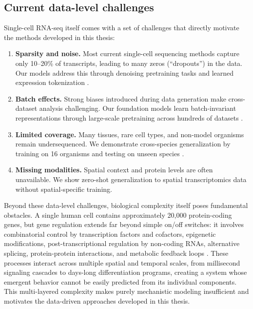 \subsection{Current data-level challenges}

Single-cell \gls{RNA-seq} itself comes with a set of challenges that directly motivate the methods
developed in this thesis:

\begin{enumerate}
  \item \textbf{Sparsity and noise.} Most current single-cell sequencing methods capture only
    10--20\% of transcripts, leading to many zeros (``dropouts'') in the data. Our models address
    this through denoising pretraining tasks and learned expression tokenization \cite{eraslanSinglecellRNAseqDenoising2019}.
  \item \textbf{Batch effects.} Strong biases introduced during data generation make cross-dataset
    analysis challenging. Our foundation models learn batch-invariant representations through
    large-scale pretraining across hundreds of datasets \cite{haghverdiBatchEffectsSinglecell2018}.
  \item \textbf{Limited coverage.} Many tissues, rare cell types, and non-model organisms remain
    undersequenced. We demonstrate cross-species generalization by training on 16 organisms and
    testing on unseen species \cite{alsabbaghFoundationModelsMeet2023}.
  \item \textbf{Missing modalities.} Spatial context and protein levels are often unavailable. We
    show zero-shot generalization to spatial transcriptomics data without spatial-specific training.
\end{enumerate}

Beyond these data-level challenges, biological complexity itself poses fundamental obstacles. A
single human cell contains approximately 20,000 protein-coding genes, but gene regulation extends
far beyond simple on/off switches: it involves combinatorial control by transcription factors and
cofactors, epigenetic modifications, post-transcriptional regulation by non-coding RNAs, alternative
splicing, protein-protein interactions, and metabolic feedback loops \cite{badia-i-mompelGeneRegulatoryNetwork2023, desaiImprovingGeneRegulatory2017, oksuzTranscriptionFactorsInteract2023}. These processes interact across
multiple spatial and temporal scales, from millisecond signaling cascades to days-long
differentiation programs, creating a system whose emergent behavior cannot be easily predicted from
its individual components. This multi-layered complexity makes purely mechanistic modeling
insufficient and motivates the data-driven approaches developed in this thesis.

